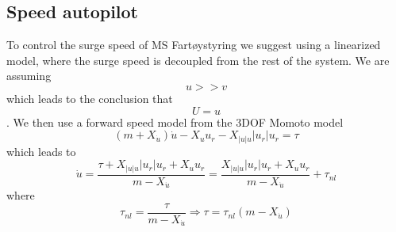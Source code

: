 \subsection{Speed autopilot}\label{sec:prob1.2}
To control the surge speed of MS Fartøystyring we suggest using a linearized model, where the surge speed is decoupled from the rest of the system. We are assuming $$u>>v$$ which leads to the conclusion that $$U=u$$.
We then use a forward speed model from the 3DOF Momoto model
\begin{equation}
(m+X_{\dot{u}})\dot{u}-X_u u_r - X_{|u|u} | u_r | u_r=\tau
\end{equation}
which leads to
\begin{equation}
\dot{u} = \frac{ \tau + X_{|u|u} |u_r| u_r +X_u u_r }{ m-X_{\dot{u}} } 
= \frac{X_{|u|u} |u_r| u_r +X_u u_r }{ m-X_{\dot{u}} } + \tau_{nl}
\end{equation}
where
\begin{equation}
\tau_{nl}  = \frac{ \tau}{ m-X_{\dot{u}} } \Rightarrow \tau = \tau_{nl}(m-X_{\dot{u}})
\end{equation}